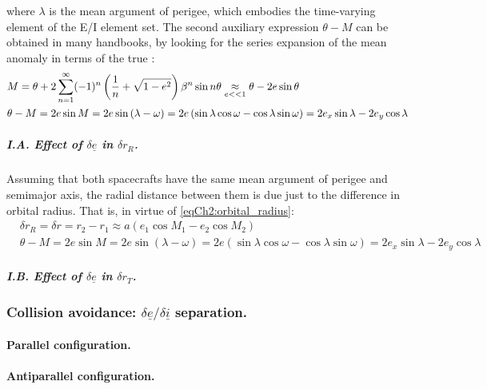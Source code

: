			\noindent where $\lambda$ is the mean argument of perigee, which embodies the time-varying element of the E/I element set. The second auxiliary expression $\theta - M$ can be obtained in many handbooks, by looking for the series expansion of the mean anomaly in terms of the true \cite{Battin}:
			\begin{align}
			&\nonumber M =\theta+ 2\displaystyle\sum_{n=1}^{\infty} (-1)^{n} \left( \dfrac{1}{n} + \sqrt{1 - e^2} \right) \beta^n \sin n\theta \underset{e<<1}{\approx} \theta - 2 e \sin\theta\\
			& \theta - M = 2 e\sin M = 2 e \sin\left(\lambda - \omega\right) = 2e\left(\sin\lambda\cos\omega - \cos\lambda\sin\omega\right) = 2 e_x\sin\lambda - 2 e_y \cos\lambda
			\label{eqCh2:M_expansion}
			\end{align}
			\subparagraph{I.A. Effect of $\delta \underline{e}$ in $\delta r_R$. \\}
			\indent Assuming that both spacecrafts have the same mean argument of perigee and semimajor axis, the radial distance between them is due just to the difference in orbital radius. That is, in virtue of \eqref{eqCh2:orbital_radius}:
			\begin{align}
			&\nonumber \delta r_R = \delta r = r_2 - r_1 \approx a \left(e_1 \cos M_1 - e_2 \cos M_2\right)\\
			& \theta - M = 2 e\sin M = 2 e \sin\left(\lambda - \omega\right) = 2e\left(\sin\lambda\cos\omega - \cos\lambda\sin\omega\right) = 2 e_x\sin\lambda - 2 e_y \cos\lambda
			\label{eqCh2:r_R_ecc}
			\end{align}
			\subparagraph{I.B. Effect of $\delta \underline{e}$ in $\delta r_T$. \\}
			
		\subsubsection{Collision avoidance: $\delta{\underline{e}} / \delta{\underline{i}}$ separation.}
			\paragraph{Parallel configuration. \\}
			\paragraph{Antiparallel configuration. \\}
